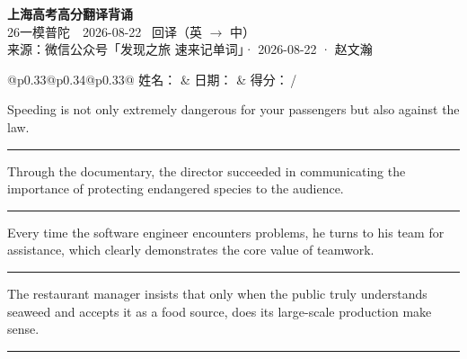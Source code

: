 \documentclass[11pt,a4paper]{article}
\newcommand{\num}[1]{\makebox[1.9em][r]{#1.}\hspace{0.3em}}
\newcommand{\wline}{\noindent\rule{\linewidth}{0.4pt}}
\begin{document}
\pagestyle{plain}
\begin{center}
{\LARGE\bfseries 上海高考高分翻译背诵 }\\[0.25em]
{\large 26一模普陀　2026-08-22 \quad\ 回译（英 $\to$ 中）}\\[0.35em]
{\footnotesize 来源：微信公众号「发现之旅 速来记单词」· 2026-08-22 · 赵文瀚}
\end{center}

\vspace{0.4em}
\noindent\begin{tabular}{@{}p{0.33\textwidth}@{}p{0.34\textwidth}@{}p{0.33\textwidth}@{}}
姓名：\underline{\hspace{2.0cm}} & 日期：\underline{\hspace{2.0cm}} & 得分：\underline{\hspace{1.4cm}}\,/ \\
\end{tabular}

\vspace{0.5em}

\vspace{0.8em}
\num{1}Speeding is not only extremely dangerous for your passengers but also against the law.

\vspace{0.25em}

\wline

\num{2}Through the documentary, the director succeeded in communicating the importance of protecting endangered species to the audience.

\vspace{0.25em}

\wline

\num{3}Every time the software engineer encounters problems, he turns to his team for assistance, which clearly demonstrates the core value of teamwork.

\vspace{0.25em}

\wline

\num{4}The restaurant manager insists that only when the public truly understands seaweed and accepts it as a food source, does its large-scale production make sense.

\vspace{0.25em}

\wline
\end{document}
